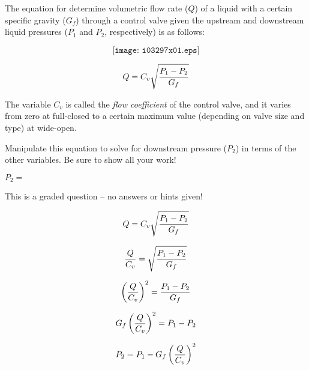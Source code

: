 

The equation for determine volumetric flow rate ($Q$) of a liquid with a certain specific gravity ($G_f$) through a control valve given the upstream and downstream liquid pressures ($P_1$ and $P_2$, respectively) is as follows:

$$\texttt{[image: i03297x01.eps]}$$

$$Q = C_v \sqrt{{P_1 - P_2} \over G_f}$$

The variable $C_v$ is called the {\it flow coefficient} of the control valve, and it varies from zero at full-closed to a certain maximum value (depending on valve size and type) at wide-open.

\vskip 30pt

Manipulate this equation to solve for downstream pressure ($P_2$) in terms of the other variables.  Be sure to show all your work!

\vskip 50pt

$P_2 =$

\vfil 

\eject






This is a graded question -- no answers or hints given!







$$Q = C_v \sqrt{{P_1 - P_2} \over G_f}$$

$${Q \over C_v} = \sqrt{{P_1 - P_2} \over G_f}$$

$$\left({Q \over C_v}\right)^2 = {{P_1 - P_2} \over G_f}$$

$$G_f \left({Q \over C_v}\right)^2 = P_1 - P_2$$

$$P_2 = P_1 - G_f \left(Q \over C_v \right)^2$$




